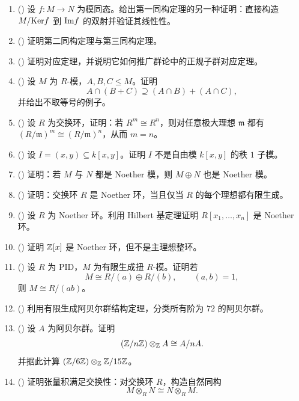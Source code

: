 \begin{enumerate}[label=\textbf{10.\arabic*.}, leftmargin=3.2em, start=26]
  \item (\medium) 设 $f\colon M\to N$ 为模同态。给出第一同构定理的另一种证明：直接构造 $M/\mathrm{Ker} f$ 到 $\mathrm{Im} f$ 的双射并验证其线性性。

  \item (\medium) 证明第二同构定理与第三同构定理。

  \item (\medium) 证明对应定理，并说明它如何推广群论中的正规子群对应定理。

  \item (\medium) 设 $M$ 为 $R$-模，$A,B,C\le M$。证明
  \[
  A\cap (B+C)\supseteq (A\cap B)+(A\cap C),
  \]
  并给出不取等号的例子。

  \item (\medium) 设 $R$ 为交换环，证明：若 $R^m\cong R^n$，则对任意极大理想 $\mathfrak m$ 都有 $(R/\mathfrak m)^m\cong (R/\mathfrak m)^n$，从而 $m=n$。

  \item (\medium) 设 $I=(x,y)\subseteq k[x,y]$。证明 $I$ 不是自由模 $k[x,y]$ 的秩 $1$ 子模。

  \item (\medium) 证明：若 $M$ 与 $N$ 都是 Noether 模，则 $M\oplus N$ 也是 Noether 模。

  \item (\medium) 证明：交换环 $R$ 是 Noether 环，当且仅当 $R$ 的每个理想都有限生成。

  \item (\medium) 设 $R$ 为 Noether 环。利用 Hilbert 基定理证明 $R[x_1,\dots,x_n]$ 是 Noether 环。

  \item (\medium) 证明 $\mathbb{Z}[x]$ 是 Noether 环，但不是主理想整环。

  \item (\medium) 设 $R$ 为 PID，$M$ 为有限生成扭 $R$-模。证明若
  \[
  M\cong R/(a)\oplus R/(b),\qquad (a,b)=1,
  \]
  则 $M\cong R/(ab)$。

  \item (\medium) 利用有限生成阿贝尔群结构定理，分类所有阶为 $72$ 的阿贝尔群。

  \item (\medium) 设 $A$ 为阿贝尔群。证明
  \[
  (\mathbb{Z}/n\mathbb{Z})\otimes_{\mathbb{Z}} A\cong A/nA.
  \]
  并据此计算 $(\mathbb{Z}/6\mathbb{Z})\otimes_{\mathbb{Z}} \mathbb{Z}/15\mathbb{Z}$。

  \item (\medium) 证明张量积满足交换性：对交换环 $R$，构造自然同构
  \[
  M\otimes_R N\cong N\otimes_R M.
  \]


\end{enumerate}
